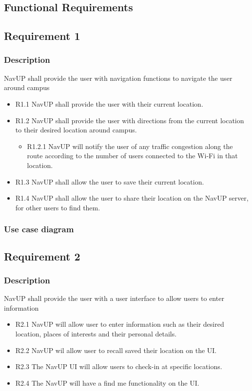 \documentclass{article}
\begin{document}
    \subsection{Functional Requirements}
    	
    	\subsection{Requirement 1}
    	\subsubsection{Description}
    	NavUP shall provide the user with navigation functions to navigate the user around campus
        \begin{itemize}
        \item R1.1 NavUP shall provide the user with their current location.
        \item R1.2 NavUP shall provide the user with directions from the current location to their desired location around campus.
            \begin{itemize}
                \item R1.2.1 NavUP will notify the user of any traffic congestion along the route according to the number of users connected to the Wi-Fi in that location.
            \end{itemize}
        \item R1.3 NavUP shall allow the user to save their current location.
        \item R1.4 NavUP shall allow the user to share their location on the NavUP server, for other users to find them.
        \end{itemize}
        \subsubsection{Use case diagram}
        \subsection{Requirement 2}
        \subsubsection{Description}
        NavUP shall provide the user with a user interface to allow users to enter information
        \begin{itemize}
        \item R2.1 NavUP will allow user to enter information such as their desired location, places of interests and their personal details.
        \item R2.2 NavUP wil allow user to recall saved their location on the UI.
        \item R2.3 The NavUP UI will allow users to check-in at specific locations.
        \item R2.4 The NavUP will have a find me functionality on the UI.
        \end{itemize}
\end{document}
